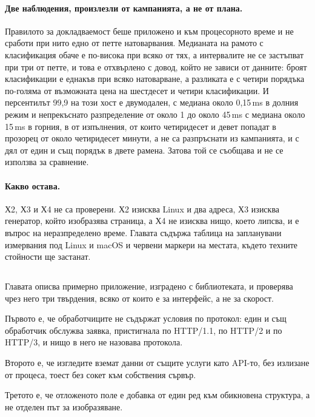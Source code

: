 \paragraph{Две наблюдения, произлезли от кампанията, а не от плана.} Правилото за докладваемост
беше приложено и към процесорното време и не сработи при нито едно от петте натоварвания.
Медианата на рамото с класификация обаче е по-висока при всяко от тях, а интервалите не се
застъпват при три от петте, и това е отхвърлено с довод, който не зависи от данните: броят
класификации е еднакъв при всяко натоварване, а разликата е с четири порядъка по-голяма от
възможната цена на шестдесет и четири класификации. И персентилът 99,9 на този хост е двумодален, с медиана около
0,15\,ms в долния режим и непрекъснато разпределение от около 1 до около 45\,ms с медиана
около 15\,ms в горния, в  от  изпълнения, от които
четиридесет и девет попадат в прозорец от около четиридесет минути, а не са разпръснати из
кампанията, и с дял от един и същ порядък в двете рамена. Затова той се съобщава и не се
използва за сравнение.

\paragraph{Какво остава.} Х2, Х3 и Х4 не са проверени. Х2 изисква Linux и два адреса, Х3
изисква генератор, който изобразява страница, а Х4 не изисква нищо, което липсва, и е въпрос
на неразпределено време. Главата съдържа таблица на запланувани измервания под Linux и macOS
и червени маркери на местата, където техните стойности ще застанат.

\subsection*{}

Главата описва примерно приложение, изградено с библиотеката, и проверява чрез него три
твърдения, всяко от които е за интерфейс, а не за скорост.

Първото е, че обработчиците не съдържат условия по протокол: един и същ обработчик обслужва
заявка, пристигнала по HTTP/1.1, по HTTP/2 и по HTTP/3, и нищо в него не назовава протокола.

Второто е, че изгледите вземат данни от същите услуги като API-то, без излизане от процеса,
тоест без сокет към собствения сървър.

Третото е, че отложеното поле е добавка от един ред към обикновена структура, а не отделен
път за изобразяване.

